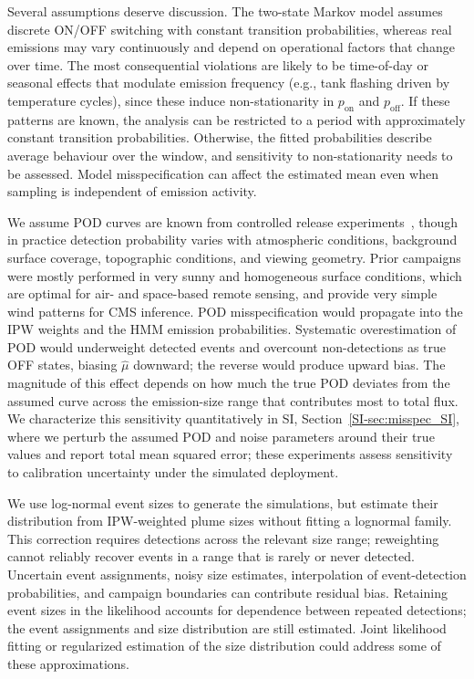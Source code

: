 \documentclass[numsec,webpdf,modern,mediumone]{oup-authoring-template}
\newcommand{\edit}[1]{#1}
\begin{document}
Several assumptions deserve discussion. The two-state Markov model assumes discrete ON/OFF switching with constant transition probabilities, whereas real emissions may vary continuously and depend on operational factors that change over time. The most consequential violations are likely to be time-of-day or seasonal effects that modulate emission frequency (e.g., tank flashing driven by temperature cycles), since these induce non-stationarity in $p_{\text{on}}$ and $p_{\text{off}}$. If these patterns are known, the analysis can be restricted to a period with approximately constant transition probabilities. Otherwise, the fitted probabilities describe average behaviour over the window, and sensitivity to non-stationarity needs to be assessed. Model misspecification can affect the estimated mean even when sampling is independent of emission activity.

We assume POD curves are known from controlled release experiments~\citep{Sherwin2021, Bell2022, ElAbbadi2024, chen2024comparing, mcmanemin2026controlled, Reuland2026}, though in practice detection probability varies with atmospheric conditions, background surface coverage, topographic conditions, and viewing geometry. Prior campaigns were mostly performed in very sunny and homogeneous surface conditions, which are optimal for air- and space-based remote sensing, and provide very simple wind patterns for CMS inference. POD misspecification would propagate into the IPW weights and the HMM emission probabilities. Systematic overestimation of POD would underweight detected events and overcount non-detections as true OFF states, biasing $\hat{\mu}$ downward; the reverse would produce upward bias. The magnitude of this effect depends on how much the true POD deviates from the assumed curve across the emission-size range that contributes most to total flux. \edit{We characterize this sensitivity quantitatively in SI, Section~\ref{SI-sec:misspec_SI}, where we perturb the assumed POD and noise parameters around their true values and report total mean squared error; these experiments assess sensitivity to calibration uncertainty under the simulated deployment.}

\edit{We use log-normal event sizes to generate the simulations, but estimate their distribution from IPW-weighted plume sizes without fitting a lognormal family. This correction requires detections across the relevant size range; reweighting cannot reliably recover events in a range that is rarely or never detected. Uncertain event assignments, noisy size estimates, interpolation of event-detection probabilities, and campaign boundaries can contribute residual bias. Retaining event sizes in the likelihood accounts for dependence between repeated detections; the event assignments and size distribution are still estimated. Joint likelihood fitting or regularized estimation of the size distribution could address some of these approximations.}
\end{document}
